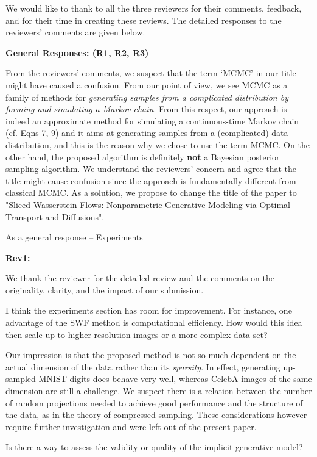 \documentclass{article}
\newcommand{\rev}[1]{{\color{red} #1}}
\newcommand{\umut}[1]{{\color{blue} #1}}
\newcommand{\antoine}[1]{{\color{orange} #1}}
\begin{document}
We would like to thank to all the three reviewers for their comments, feedback, and for their time in creating these reviews. The detailed responses to the reviewers' comments are given below.

\textbf{General Responses: (R1, R2, R3)}

From the reviewers' comments, we suspect that the term `MCMC' in our title might have caused a confusion. From our point of view, we see MCMC as a family of methods for \emph{generating samples from a complicated distribution by forming and simulating a Markov chain}. From this respect, our approach is indeed an approximate method for simulating a continuous-time Markov chain (cf. Eqns 7, 9) and it aims at generating samples from a (complicated) data distribution, and this is the reason why we chose to use the term MCMC. On the other hand, the proposed algorithm is definitely \textbf{not} a Bayesian posterior sampling algorithm. We understand the reviewers' concern and agree that the title might cause confusion since the approach is fundamentally different from classical MCMC. As a solution, we propose to change the title of the paper to "Sliced-Wasserstein Flows: Nonparametric Generative Modeling via Optimal Transport and Diffusions".

\umut{As a general response -- Experiments}

\textbf{Rev1: }

We thank the reviewer for the detailed review and the comments on the originality, clarity, and the impact of our submission.

\rev{I think the experiments section has room for improvement. For instance, one advantage of the SWF method is computational efficiency. How would this idea then scale up to higher resolution images or a more complex data set?}

\antoine{Our impression is that the proposed method is not so much dependent on the actual dimension of the data rather than its \textit{sparsity}. In effect, generating up-sampled MNIST digits does behave very well, whereas CelebA images of the same dimension are still a challenge. We suspect there is a relation between the number of random projections needed to achieve good performance and the structure of the data, as in the theory of compressed sampling. These considerations however require further investigation and were left out of the present paper.}

\rev{Is there a way to assess the validity or quality of the implicit generative model?}
\end{document}
